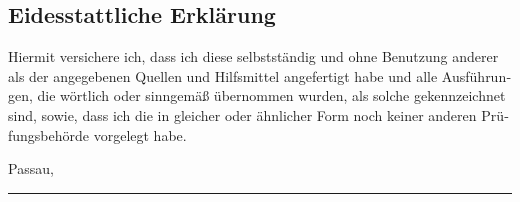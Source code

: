 \begin{german}
\chapter{Eidesstattliche Erklärung}

	Hiermit versichere ich, dass ich diese \thesisType{} selbstständig und ohne Benutzung anderer als der angegebenen Quellen und Hilfsmittel angefertigt habe und alle Ausführungen, die wörtlich oder sinngemäß übernommen wurden, als solche gekennzeichnet sind, sowie, dass ich die \thesisType in gleicher oder ähnlicher Form noch keiner anderen Prüfungsbehörde vorgelegt habe.

	\vspace{3cm}

	Passau, \thedate

	\vspace{2cm}

	\parbox{8cm}{
		\hrule \strut \theauthor
	}
\end{german}
